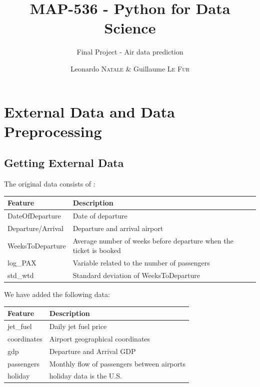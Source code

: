 \documentclass[a4paper,12pt,twoside]{article}
\title{MAP-536 - Python for Data Science}
\subtitle{Final Project - Air data prediction}
\author{Leonardo \textsc{Natale} \& Guillaume \textsc{Le Fur}}
\begin{document}
\maketitle

\section{External Data and Data Preprocessing}

\subsection{Getting External Data}

The original data consists of : 

\begin{table}[H]
	\centering
	\begin{tabular}{|l|l|}
	\hline
	\textbf{Feature} & \textbf{Description}                          \\ \hline
	DateOfDeparture  & Date of departure                             \\ \hline
	Departure/Arrival& Departure and arrival airport                 \\ \hline
	WeeksToDeparture & Average number of weeks before departure when the ticket is booked \\ \hline
	log\_PAX          & Variable related to the number of passengers \\ \hline
	std\_wtd          & Standard deviation of WeeksToDeparture       \\ \hline
	\end{tabular}
\end{table}

We have added the following data:

\begin{table}[H]
	\centering
	\begin{tabular}{|l|l|}
	\hline
	\textbf{Feature} & \textbf{Description}                        \\ \hline
	jet\_fuel        & Daily jet fuel price                        \\ \hline
	coordinates      & Airport geographical coordinates            \\ \hline
	gdp              & Departure and Arrival GDP                   \\ \hline
	passengers       & Monthly flow of passengers between airports \\ \hline
	holiday          & holiday data is the U.S.                    \\ \hline
	\end{tabular}
\end{table}
\end{document}
